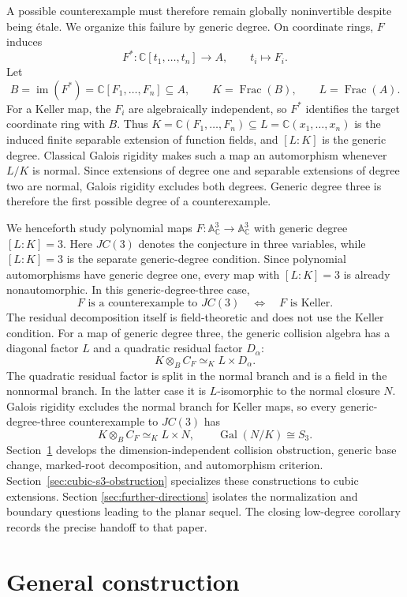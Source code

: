 \documentclass[11pt]{article}
\theoremstyle{remark}
\DeclareMathOperator{\Frac}{Frac}
\DeclareMathOperator{\Gal}{Gal}
\newcommand{\A}{\mathbb A}
\newcommand{\C}{\mathbb C}
\begin{document}
A possible counterexample must therefore remain globally noninvertible
despite being \'etale.  We organize this failure by generic degree.  On
coordinate rings, \(F\) induces
\[
  F^*\colon\C[t_1,\dots,t_n]\longrightarrow A,
  \qquad t_i\longmapsto F_i.
\]
Let
\[
  B=\operatorname{im}(F^*)=\C[F_1,\dots,F_n]\subseteq A,
  \qquad K=\Frac(B),
  \qquad L=\Frac(A).
\]
For a Keller map, the \(F_i\) are algebraically independent, so \(F^*\)
identifies the target coordinate ring with \(B\).  Thus
\(K=\C(F_1,\dots,F_n)\subseteq L=\C(x_1,\dots,x_n)\) is the induced
finite separable extension of function fields, and \([L:K]\) is the
generic degree.  Classical Galois rigidity makes such a map an automorphism
whenever \(L/K\) is normal.  Since extensions of degree one and separable
extensions of degree two are normal, Galois rigidity excludes both degrees.
Generic degree three is therefore the first possible degree of a
counterexample.

We henceforth study polynomial maps
\(F\colon\A^3_{\C}\to\A^3_{\C}\) with generic degree \([L:K]=3\).
Here \(JC(3)\) denotes the conjecture in three variables, while
\([L:K]=3\) is the separate generic-degree condition.  Since polynomial
automorphisms have generic degree one, every map with \([L:K]=3\) is already
nonautomorphic.  In this generic-degree-three case,
\[
  F\text{ is a counterexample to }JC(3)
  \quad\Longleftrightarrow\quad
  F\text{ is Keller}.
\]
The residual decomposition itself is field-theoretic and does not use the
Keller condition.  For a map of generic degree three, the generic collision
algebra has a diagonal factor \(L\) and a quadratic residual factor
\(D_\alpha\):
\[
  K\otimes_BC_F\simeq_K L\times D_\alpha.
\]
The quadratic residual factor is split in the normal branch and is a field
in the nonnormal branch.  In the latter case it is \(L\)-isomorphic to the
normal closure \(N\).  Galois rigidity excludes the normal branch for Keller
maps, so every generic-degree-three counterexample to \(JC(3)\) has
\[
  K\otimes_BC_F\simeq_K L\times N,
  \qquad
  \Gal(N/K)\cong S_3.
\]
Section~\ref{sec:general-construction} develops the dimension-independent
collision obstruction, generic base change, marked-root decomposition, and
automorphism criterion.  Section~\ref{sec:cubic-s3-obstruction} specializes
these constructions to cubic extensions.  Section
\ref{sec:further-directions} isolates the normalization and boundary
questions leading to the planar sequel.  The closing low-degree corollary
records the precise handoff to that paper.

\section{General construction}
\label{sec:general-construction}
\end{document}
